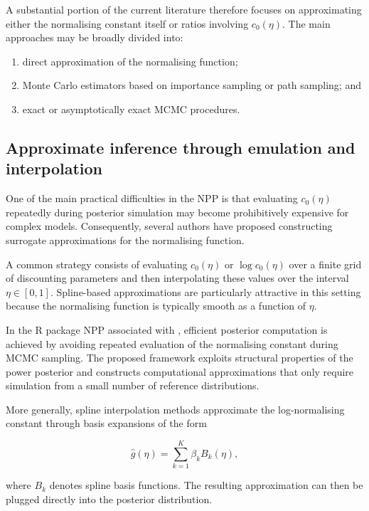 A substantial portion of the current literature therefore focuses on approximating either the normalising constant itself or ratios involving $c_0(\eta)$.
The main approaches may be broadly divided into:
\begin{enumerate}[label=(\roman*)]
\item direct approximation of the normalising function;
\item Monte Carlo estimators based on importance sampling or path sampling; and
\item exact or asymptotically exact MCMC procedures.
\end{enumerate}
\subsection{Approximate inference through emulation and interpolation}

One of the main practical difficulties in the NPP is that evaluating $c_0(\eta)$ repeatedly during posterior simulation may become prohibitively expensive for complex models.
Consequently, several authors have proposed constructing surrogate approximations for the normalising function.

A common strategy consists of evaluating $c_0(\eta)$ or $\log c_0(\eta)$ over a finite grid of discounting parameters and then interpolating these values over the interval $\eta \in [0,1]$.
Spline-based approximations are particularly attractive in this setting because the normalising function is typically smooth as a function of $\eta$.

In the R package NPP associated with , efficient posterior computation is achieved by avoiding repeated evaluation of the normalising constant during MCMC sampling.
The proposed framework exploits structural properties of the power posterior and constructs computational approximations that only require simulation from a small number of reference distributions.

More generally, spline interpolation methods approximate the log-normalising constant through basis expansions of the form

\begin{equation}
    \widehat g(\eta)
    =
    \sum_{k=1}^K
    \beta_k
    B_k(\eta),
\end{equation}

where $B_k$ denotes spline basis functions.
The resulting approximation can then be plugged directly into the posterior distribution.

